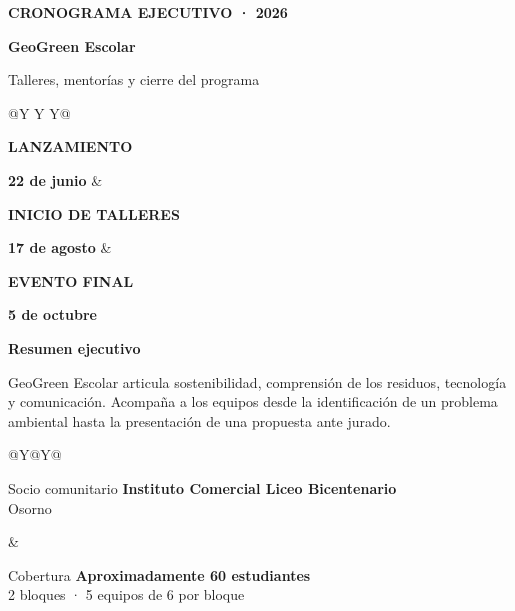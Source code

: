 \documentclass[10pt,a4paper]{article}
\begin{document}
\fontsize{10.2}{12.6}\selectfont

\begin{hero}
{\small\bfseries\color{white!78}\MakeUppercase{Cronograma ejecutivo · 2026}\par}
\vspace{2.5mm}
{\fontsize{27}{31}\selectfont\bfseries\color{white}GeoGreen Escolar\par}
\vspace{1mm}
{\Large\color{white!82}Talleres, mentorías y cierre del programa\par}

\vspace{4mm}
\begin{tabularx}{\linewidth}{@{}Y Y Y@{}}
{\scriptsize\bfseries\color{white!65}LANZAMIENTO\par}
{\normalsize\bfseries\color{white}22 de junio}
&
{\scriptsize\bfseries\color{white!65}INICIO DE TALLERES\par}
{\normalsize\bfseries\color{white}17 de agosto}
&
{\scriptsize\bfseries\color{white!65}EVENTO FINAL\par}
{\normalsize\bfseries\color{white}5 de octubre}
\end{tabularx}
\end{hero}

{\Large\bfseries\color{AIEPNavy}Resumen ejecutivo\par}
\vspace{1.5mm}
GeoGreen Escolar articula sostenibilidad, comprensión de los residuos,
tecnología y comunicación. Acompaña a los equipos desde la identificación de un
problema ambiental hasta la presentación de una propuesta ante jurado.

\vspace{3mm}
\begin{tabularx}{\textwidth}{@{}Y@{\hspace{3mm}}Y@{}}
\begin{factbox}[height=21mm]{Socio comunitario}
\textbf{Instituto Comercial Liceo Bicentenario}\\[-0.3mm]
\textcolor{AIEPMuted}{Osorno}
\end{factbox}
&
\begin{factbox}[height=21mm]{Cobertura}
\textbf{Aproximadamente 60 estudiantes}\\[-0.3mm]
\textcolor{AIEPMuted}{2 bloques · 5 equipos de 6 por bloque}
\end{factbox}
\end{tabularx}
\end{document}
